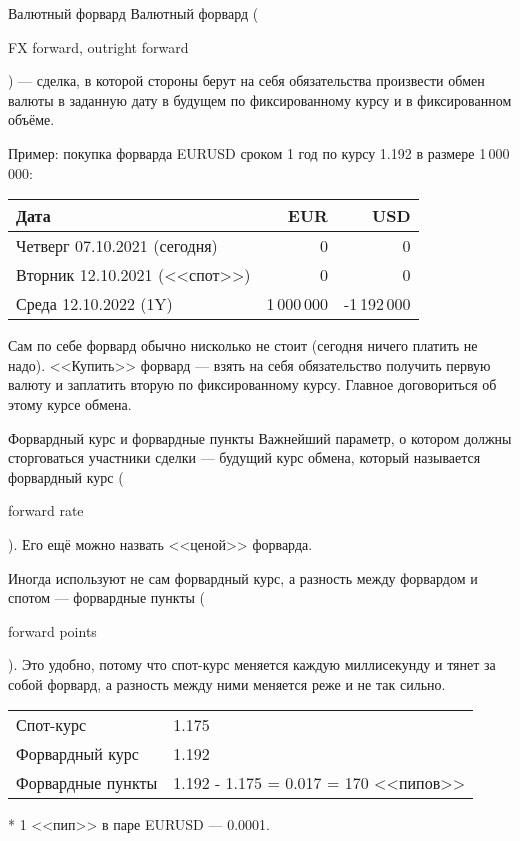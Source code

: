 \documentclass{beamer}
\newcommand{\en}[1]{\begin{otherlanguage}{english}#1\end{otherlanguage}}
\begin{document}
\begin{frame}{Валютный форвард}
\justify
Валютный форвард (\en{FX forward, outright forward}) --- сделка, в которой стороны берут 
на себя обязательства произвести обмен валюты в заданную дату в будущем по 
фиксированному курсу и в фиксированном объёме. 

\justify
Пример: покупка форварда EURUSD сроком 1 год по курсу 1.192 в размере 1\,000\,000:

\centering
\begin{tabular}{l|r|r}
Дата                          & EUR & USD \\ \hline
Четверг 07.10.2021 (сегодня)  & 0   & 0   \\
Вторник 12.10.2021 (<<спот>>) & 0   & 0   \\
Среда   12.10.2022 (1Y)   & 1\,000\,000 & -1\,192\,000
\end{tabular}

\justify
Сам по себе форвард обычно нисколько не стоит (сегодня ничего платить не надо). <<Купить>> форвард --- взять на себя обязательство получить первую валюту и заплатить вторую по фиксированному курсу. Главное договориться об этому курсе обмена.
\end{frame}



\begin{frame}{Форвардный курс и форвардные пункты}
\justify
Важнейший параметр, о котором должны сторговаться участники сделки --- будущий курс обмена, который называется форвардный курс (\en{forward rate}). Его ещё можно назвать <<ценой>> форварда.

\justify
Иногда используют не сам форвардный курс, а разность между форвардом и спотом --- форвардные пункты (\en{forward points}). Это удобно, потому что спот-курс меняется каждую миллисекунду и тянет за собой форвард, а разность между ними меняется реже и не так сильно.

\vspace{\baselineskip}
\centering
\begin{tabular}{l|l}
Спот-курс & 1.175 \\
Форвардный курс & 1.192 \\
\hline
Форвардные пункты & 1.192 - 1.175 = 0.017 = 170 <<пипов>>
\end{tabular}

\justify
* 1 <<пип>> в паре EURUSD --- 0.0001.
\end{frame}
\end{document}
